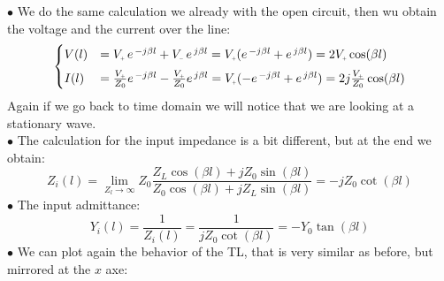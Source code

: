$\bullet$ We do the same calculation we already with the open circuit, then wu obtain the voltage and the current over the line:
\begin{equation}
    \begin{cases}
      V(l)&=V\bottomPlus\,e^{\,-j\beta l}+V\bottomMinus\,e^{\,j\beta l}=V\bottomPlus(e^{\,-j\beta l}+e^{\,j\beta l})=2V\bottomPlus\cos (\beta l)\\[5pt]
      I(l)&=\frac{V\bottomPlus}{Z_0}e^{\,-j\beta l}-\frac{V\bottomPlus}{Z_0}e^{\,j\beta l}=V\bottomPlus(-e^{\,-j\beta l}+e^{\,j\beta l})=2j\frac{V\bottomPlus}{Z_0}\cos (\beta l)
    \end{cases}
\end{equation}
Again if we go back to time domain we will notice that we are looking at a stationary wave.\\
$\bullet$ The calculation for the input impedance is a bit different, but at the end we obtain:
\begin{equation}\label{eq:open_circuit_TL}
    Z_i(l)=\lim_{Z_l\rightarrow\infty} Z_0\frac{Z_L\cos(\beta l)+jZ_0 \sin(\beta l)}{Z_0\cos(\beta l)+jZ_L\sin(\beta l)}=-jZ_0\cot(\beta l)
\end{equation}
$\bullet$ The input admittance:
\begin{equation}\label{input_admittance_of_a_short}
    Y_i(l)=\frac{1}{Z_i(l)}=\frac{1}{jZ_0\cot(\beta l)}=-Y_0\tan(\beta l)
\end{equation}
$\bullet$ We can plot again the behavior of the TL, that is very similar as before, but mirrored at the $x$ axe:
